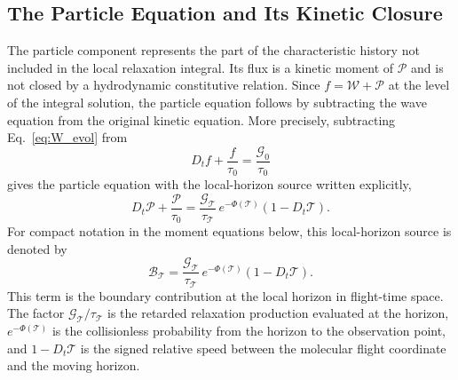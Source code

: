 \documentclass[preprint,12pt]{elsarticle}
\begin{document}
\subsection{The Particle Equation and Its Kinetic Closure}\label{sec:particle_operator}

The particle component represents the part of the characteristic history not included in the local relaxation integral. Its flux is a kinetic moment of $\mathcal{P}$ and is not closed by a hydrodynamic constitutive relation. Since $f=\mathcal{W}+\mathcal{P}$ at the level of the integral solution, the particle equation follows by subtracting the wave equation from the original kinetic equation. More precisely, subtracting Eq.~\eqref{eq:W_evol} from
\begin{equation}
    D_t f+\frac{f}{\tau_0}=\frac{\mathcal{G}_0}{\tau_0}
\end{equation}
gives the particle equation with the local-horizon source written explicitly,
\begin{equation}\label{eq:P_evol}
    D_t\mathcal{P}+\frac{\mathcal{P}}{\tau_0}
    =
    \frac{\mathcal{G}_\mathcal{T}}{\tau_\mathcal{T}}\,e^{-\Phi(\mathcal{T})}\left(1-D_t \mathcal{T}\right).
\end{equation}
For compact notation in the moment equations below, this local-horizon source is denoted by
\begin{equation}\label{eq:source_term}
    \mathcal B_\mathcal{T}
    =
    \frac{\mathcal{G}_\mathcal{T}}{\tau_\mathcal{T}}\,e^{-\Phi(\mathcal{T})}\left(1-D_t \mathcal{T}\right).
\end{equation}
This term is the boundary contribution at the local horizon in flight-time space. The factor $\mathcal{G}_\mathcal{T}/\tau_\mathcal{T}$ is the retarded relaxation production evaluated at the horizon, $e^{-\Phi(\mathcal{T})}$ is the collisionless probability from the horizon to the observation point, and $1-D_t \mathcal{T}$ is the signed relative speed between the molecular flight coordinate and the moving horizon.
\end{document}
